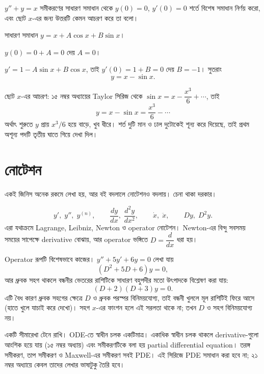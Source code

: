 \documentclass[11pt]{article}
\begin{document}
 $y'' + y = x$ সমীকরণের সাধারণ সমাধান থেকে $y(0) = 0$, $y'(0) = 0$
শর্তে বিশেষ সমাধান নির্ণয় করো, এবং ছোট $x$-এর জন্য উত্তরটি কেমন আচরণ করে তা
বলো।

\begin{sol}
সাধারণ সমাধান $y = x + A\cos x + B\sin x$।

$y(0) = 0 + A = 0$ দেয় $A = 0$।

$y' = 1 - A\sin x + B\cos x$, তাই $y'(0) = 1 + B = 0$ দেয় $B = -1$। সুতরাং
\[
  y = x - \sin x .
\]

ছোট $x$-এর আচরণ: ১৫ নম্বর অধ্যায়ের Taylor সিরিজ থেকে
$\sin x = x - \dfrac{x^{3}}{6} + \cdots$, তাই
\[
  y = x - \sin x = \frac{x^{3}}{6} - \cdots
\]
অর্থাৎ শুরুতে $y$ প্রায় $x^{3}/6$ হয়ে বাড়ে, খুব ধীরে। শর্ত দুটি মান ও ঢাল
দুটোকেই শূন্য করে দিয়েছে, তাই প্রথম অশূন্য পদটি তৃতীয় ঘাতে গিয়ে দেখা দিল।
\end{sol}

\section{নোটেশন}

একই জিনিস অনেক রকমে লেখা হয়, আর বই বদলালে নোটেশনও বদলায়। চেনা থাকা দরকার।

\begin{idea}[চারটি লেখার ভঙ্গি]
\[
  y', \; y'', \; y^{(n)}, \qquad
  \frac{dy}{dx}, \; \frac{d^{2}y}{dx^{2}}, \qquad
  \dot{x}, \; \ddot{x}, \qquad
  Dy, \; D^{2}y .
\]
এরা যথাক্রমে Lagrange, Leibniz, Newton ও operator নোটেশন। Newton-এর বিন্দু
সবসময় সময়ের সাপেক্ষে derivative বোঝায়, আর operator ভঙ্গিতে
$D = \dfrac{d}{dx}$ ধরা হয়।
\end{idea}

Operator রূপটি বিশেষভাবে কাজের। $y'' + 5y' + 6y = 0$ লেখা যায়
\[
  \left( D^{2} + 5D + 6 \right)y = 0 ,
\]
আর ধ্রুবক সহগ থাকলে বন্ধনীর ভেতরের রাশিটিকে সাধারণ বহুপদীর মতো উৎপাদকে
বিশ্লেষণ করা যায়:
\[
  \left( D+2 \right)\left( D+3 \right)y = 0 .
\]
এটি বৈধ কারণ ধ্রুবক সহগের ক্ষেত্রে $D$ ও ধ্রুবক পরস্পর বিনিময়যোগ্য, তাই
বন্ধনী খুললে মূল রাশিটিই ফিরে আসে (হাতে খুলে যাচাই করে দেখো)। সহগ $x$-এর
ফাংশন হলে এই সরলতা থাকে না; তখন $D$ ও সহগ বিনিময়যোগ্য নয়।

\begin{remark}
একটি সীমারেখা টেনে রাখি। ODE-তে স্বাধীন চলক একটিমাত্র। একাধিক স্বাধীন চলক
থাকলে derivative-গুলো আংশিক হয়ে যায় (১৫ নম্বর অধ্যায়) এবং সমীকরণটিকে বলা
হয় partial differential equation। তরঙ্গ সমীকরণ, তাপ সমীকরণ ও Maxwell-এর
সমীকরণ সবই PDE। এই সিরিজে PDE সমাধান করা হবে না; ২১ নম্বর অধ্যায়ে কেবল
তাদের লেখার ভাষাটুকু তৈরি হবে।
\end{remark}
\end{document}
